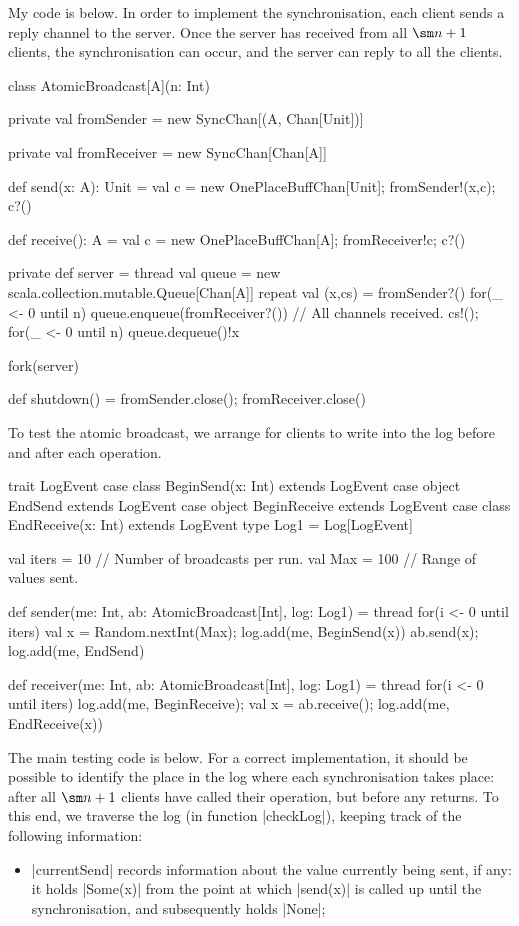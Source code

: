 \begin{answerS}
My code is below.  In order to implement the synchronisation, each client
sends a reply channel to the server.  Once the server has received from all
$\sm n+1$ clients, the synchronisation can occur, and the server can reply to
all the clients.
%
\begin{scala}
class AtomicBroadcast[A](n: Int){
  private val fromSender = new SyncChan[(A, Chan[Unit])]

  private val fromReceiver = new SyncChan[Chan[A]]

  def send(x: A): Unit = {
    val c = new OnePlaceBuffChan[Unit]; fromSender!(x,c); c?()
  }

  def receive(): A = {
    val c = new OnePlaceBuffChan[A]; fromReceiver!c; c?()
  }

  private def server = thread{
    val queue = new scala.collection.mutable.Queue[Chan[A]]
    repeat{
      val (x,cs) = fromSender?()
      for(_ <- 0 until n) queue.enqueue(fromReceiver?())
      // All channels received.
      cs!(); for(_ <- 0 until n) queue.dequeue()!x
    }
  }

  fork(server)

  def shutdown() = { fromSender.close(); fromReceiver.close() }
}
\end{scala}

To test the atomic broadcast, we arrange for clients to write into the log
before and after each operation.  

\begin{scala}
  trait LogEvent
  case class BeginSend(x: Int) extends LogEvent
  case object EndSend extends LogEvent
  case object BeginReceive extends LogEvent
  case class EndReceive(x: Int) extends LogEvent
  type Log1 = Log[LogEvent] 

  val iters = 10 // Number of broadcasts per run.
  val Max = 100 // Range of values sent.

  def sender(me: Int, ab: AtomicBroadcast[Int], log: Log1) = thread{
    for(i <- 0 until iters){
      val x = Random.nextInt(Max); log.add(me, BeginSend(x))
      ab.send(x); log.add(me, EndSend)
    }
  }

  def receiver(me: Int, ab: AtomicBroadcast[Int], log: Log1) = thread{
    for(i <- 0 until iters){
      log.add(me, BeginReceive); val x = ab.receive(); log.add(me, EndReceive(x))
    }
  }
\end{scala}

The main testing code is below.  For a correct implementation, it should be
possible to identify the place in the log where each synchronisation takes
place: after all $\sm n+1$ clients have called their operation, but before any
returns.  To this end, we traverse the log (in function |checkLog|), keeping
track of the following information:
%
\begin{itemize}
\item |currentSend| records information about the value currently being sent,
  if any: it holds |Some(x)| from the point at which |send(x)| is called up
  until the synchronisation, and subsequently holds |None|;


\end{itemize}
\end{answerS}
